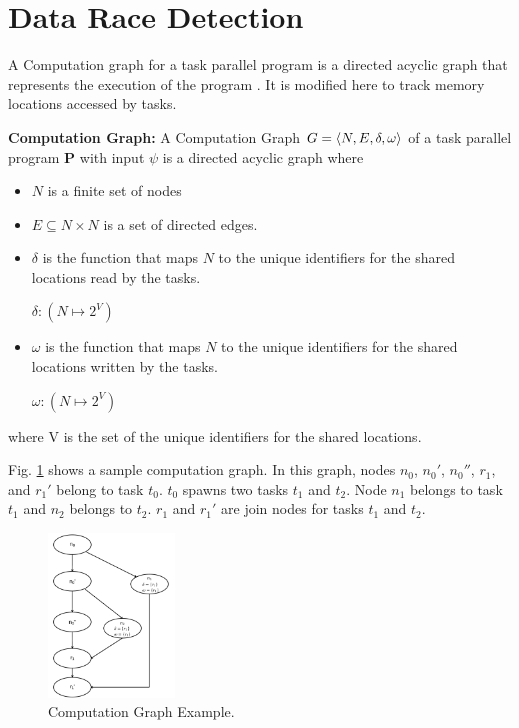 \section{Data Race Detection} \label{sec:drd}
A Computation graph for a task parallel program is a directed acyclic graph that represents the execution of the program \cite{dennis2012determinacy}. It is modified here to track memory locations accessed by tasks. 

\begin{definition}
\textbf{Computation Graph:} A Computation Graph 
$G = \langle N, E, \delta, \omega \rangle $ of a task parallel program \textbf{P} with input $\psi$ is a directed acyclic graph where

\begin{itemize}
\item $N$ is a finite set of nodes
\item $E \subseteq N \times N$ is a set of directed edges. 
\item $\delta$ is the function that maps $N$ to the unique identifiers for the shared locations read by the tasks.
\begin{center}
$\delta : (N \mapsto 2^{V})$ 
\end{center}
\item $\omega$ is the function that maps $N$ to the unique identifiers for the shared locations written by the tasks.
\begin{center}
$\omega : (N \mapsto 2^{V})$ 
\end{center}
\end{itemize}
where V is the set of the unique identifiers for the shared locations.
\end{definition}

Fig. \ref{fig:cg} shows a sample computation graph. In this graph, nodes $n_0$, $n_0'$, $n_0''$, $r_1$, and $r_1'$ belong to task $t_0$. $t_0$ spawns two tasks $t_1$ and $t_2$. Node $n_1$ belongs to task $t_1$ and $n_2$ belongs to $t_2$. $r_1$ and $r_1'$ are join nodes for tasks $t_1$ and $t_2$. 

\begin{figure}
  \centering
        \includegraphics[width=0.3\textwidth]{../figs/Fig3-1.pdf}
    \caption{Computation Graph Example.}
    \label{fig:cg}
\end{figure}

